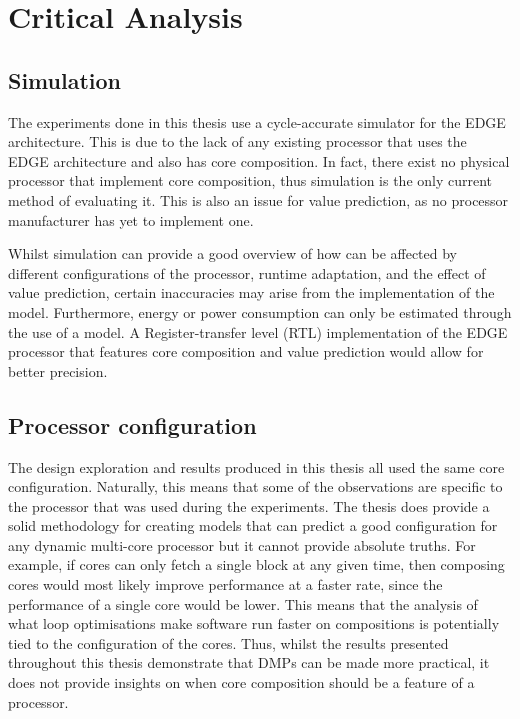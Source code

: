 \section{Critical Analysis}

\subsection{Simulation}

The experiments done in this thesis use a cycle-accurate simulator for the EDGE architecture.
This is due to the lack of any existing processor that uses the EDGE architecture and also has core composition.
In fact, there exist no physical processor that implement core composition, thus simulation is the only current method of evaluating it.
This is also an issue for value prediction, as no processor manufacturer has yet to implement one.

Whilst simulation can provide a good overview of how can be affected by different configurations of the processor, runtime adaptation, and the effect of value prediction, certain inaccuracies may arise from the implementation of the model.
Furthermore, energy or power consumption can only be estimated through the use of a model.
A Register-transfer level (RTL) implementation of the EDGE processor that features core composition and value prediction would allow for better precision.

\subsection{Processor configuration}
The design exploration and results produced in this thesis all used the same core configuration.
Naturally, this means that some of the observations are specific to the processor that was used during the experiments.
The thesis does provide a solid methodology for creating models that can predict a good configuration for any dynamic multi-core processor but it cannot provide absolute truths.
For example, if cores can only fetch a single block at any given time, then composing cores would most likely improve performance at a faster rate, since the performance of a single core would be lower.
This means that the analysis of what loop optimisations make software run faster on compositions is potentially tied to the configuration of the cores.
Thus, whilst the results presented throughout this thesis demonstrate that DMPs can be made more practical, it does not provide insights on when core composition should be a feature of a processor.

